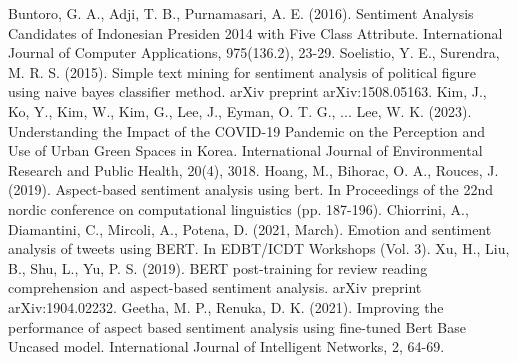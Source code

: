 \documentclass[conference]{IEEEtran}
\begin{document}
\begin{thebibliography}{00}
	 Buntoro, G. A., Adji, T. B., Purnamasari, A. E. (2016). Sentiment Analysis Candidates of Indonesian Presiden 2014 with Five Class Attribute. International Journal of Computer Applications, 975(136.2), 23-29.
	 Soelistio, Y. E., Surendra, M. R. S. (2015). Simple text mining for sentiment analysis of political figure using naive bayes classifier method. arXiv preprint arXiv:1508.05163.
	 Kim, J., Ko, Y., Kim, W., Kim, G., Lee, J., Eyman, O. T. G., ... Lee, W. K. (2023). Understanding the Impact of the COVID-19 Pandemic on the Perception and Use of Urban Green Spaces in Korea. International Journal of Environmental Research and Public Health, 20(4), 3018.
	Hoang, M., Bihorac, O. A., Rouces, J. (2019). Aspect-based sentiment analysis using bert. In Proceedings of the 22nd nordic conference on computational linguistics (pp. 187-196).
	Chiorrini, A., Diamantini, C., Mircoli, A., Potena, D. (2021, March). Emotion and sentiment analysis of tweets using BERT. In EDBT/ICDT Workshops (Vol. 3).
	 Xu, H., Liu, B., Shu, L., Yu, P. S. (2019). BERT post-training for review reading comprehension and aspect-based sentiment analysis. arXiv preprint arXiv:1904.02232.
	Geetha, M. P., Renuka, D. K. (2021). Improving the performance of aspect based sentiment analysis using fine-tuned Bert Base Uncased model. International Journal of Intelligent Networks, 2, 64-69.
\end{thebibliography}
\end{document}
